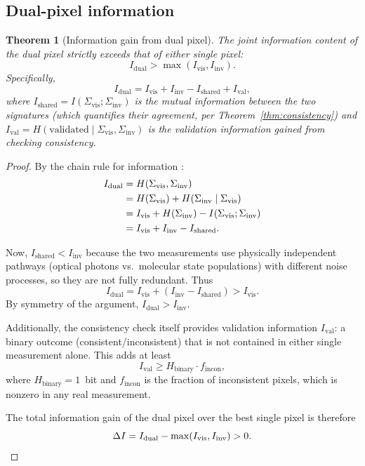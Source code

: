 \documentclass[11pt,twocolumn,a4paper]{article}
\newtheorem{theorem}{Theorem}
\newcommand{\Sigvis}{\Sigma_{\mathrm{vis}}}
\newcommand{\Siginv}{\Sigma_{\mathrm{inv}}}
\begin{document}
\subsection{Dual-pixel information}

\begin{theorem}[Information gain from dual pixel]\label{thm:info_gain}
The joint information content of the dual pixel strictly exceeds that of either single pixel:
\begin{equation}\label{eq:info_gain}
I_{\mathrm{dual}} > \max(I_{\mathrm{vis}}, I_{\mathrm{inv}}).
\end{equation}
Specifically,
\begin{equation}\label{eq:info_gain_quant}
I_{\mathrm{dual}} = I_{\mathrm{vis}} + I_{\mathrm{inv}} - I_{\mathrm{shared}} + I_{\mathrm{val}},
\end{equation}
where $I_{\mathrm{shared}} = I(\Sigvis; \Siginv)$ is the mutual information between the two signatures (which quantifies their agreement, per Theorem~\ref{thm:consistency}) and $I_{\mathrm{val}} = H(\text{validated} \mid \Sigvis, \Siginv)$ is the validation information gained from checking consistency.
\end{theorem}
\begin{proof}
By the chain rule for information \citep{CoverThomas2006}:
\begin{align}
I_{\mathrm{dual}} &= H(\Sigvis, \Siginv) \notag \\
&= H(\Sigvis) + H(\Siginv \mid \Sigvis) \notag \\
&= I_{\mathrm{vis}} + H(\Siginv) - I(\Sigvis; \Siginv) \notag \\
&= I_{\mathrm{vis}} + I_{\mathrm{inv}} - I_{\mathrm{shared}}.
\end{align}

Now, $I_{\mathrm{shared}} < I_{\mathrm{inv}}$ because the two measurements use physically independent pathways (optical photons vs.\ molecular state populations) with different noise processes, so they are not fully redundant.
Thus
\begin{equation}
I_{\mathrm{dual}} = I_{\mathrm{vis}} + (I_{\mathrm{inv}} - I_{\mathrm{shared}}) > I_{\mathrm{vis}}.
\end{equation}
By symmetry of the argument, $I_{\mathrm{dual}} > I_{\mathrm{inv}}$.

Additionally, the consistency check itself provides validation information $I_{\mathrm{val}}$: a binary outcome (consistent/inconsistent) that is not contained in either single measurement alone.
This adds at least
\begin{equation}
I_{\mathrm{val}} \geq H_{\mathrm{binary}} \cdot f_{\mathrm{incon}},
\end{equation}
where $H_{\mathrm{binary}} = 1$~bit and $f_{\mathrm{incon}}$ is the fraction of inconsistent pixels, which is nonzero in any real measurement.

The total information gain of the dual pixel over the best single pixel is therefore
\begin{equation}
\Delta I = I_{\mathrm{dual}} - \max(I_{\mathrm{vis}}, I_{\mathrm{inv}}) > 0. \qedhere
\end{equation}
\end{proof}
\end{document}
